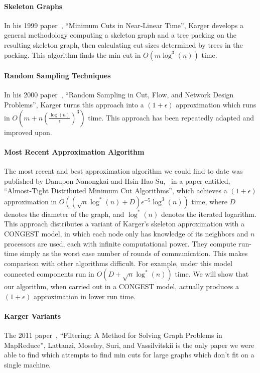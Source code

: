 \documentclass{article}
\begin{document}
\paragraph{Skeleton Graphs} In his 1999 paper~\cite{Skeleton}, ``Minimum Cuts in Near-Linear Time'', Karger develops a general methodology computing a skeleton graph and a tree packing on the resulting skeleton graph, then calculating cut sizes determined by trees in the packing. This algorithm finds the min cut in $O(m \log^3(n))$ time.

\paragraph{Random Sampling Techniques} In his 2000 paper~\cite{Random-Sampling}, ``Random Sampling in Cut, Flow, and Network Design Problems'', Karger turns this approach into a $(1+\epsilon)$ approximation which runs in $O(m + n(\frac{\log(n)}{\epsilon})^3)$ time. This approach has been repeatedly adapted and improved upon. 

\paragraph{Most Recent Approximation Algorithm}
The most recent and best approximation algorithm we could find to date was published by Danupon Nanongkai and Hsin-Hao Su,~\cite{Almost-Tight} in a paper entitled, ``Almost-Tight Distributed Minimum Cut Algorithms'', which achieves a $(1 + \epsilon)$ approximation in $O((\sqrt{n} \log^*(n) + D) \epsilon^{-5} \log^3(n))$ time, where $D$ denotes the diameter of the graph, and $\log^*(n)$ denotes the iterated logarithm. This approach distributes a variant of Karger's skeleton approximation with a CONGEST model, in which each node only has knowledge of its neighbors and $n$ processors are used, each with infinite computational power. They compute run-time simply as the worst case number of rounds of communication. This makes comparison with other algorithms difficult. For example, under this model connected components run in $O(D + \sqrt{n} \log^*(n))$ time. We will show that our algorithm, when carried out in a CONGEST model, actually produces a $(1+\epsilon)$ approximation in lower run time.

\paragraph*{Karger Variants} The 2011 paper~\cite{Map-Reduce-Karger}, ``Filtering: A Method for Solving Graph Problems in MapReduce'', Lattanzi, Moseley, Suri, and Vassilvitskii is the only paper we were able to find which attempts to find min cuts for large graphs which don't fit on a single machine. 
\end{document}
